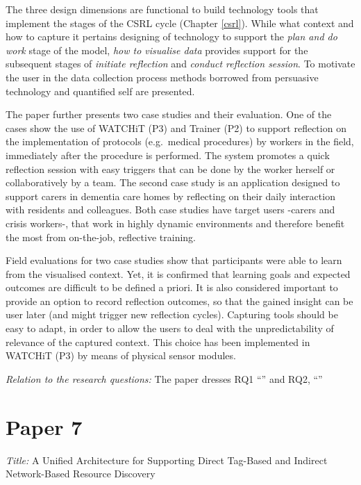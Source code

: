 The three design dimensions are functional to build technology tools that implement the stages of the CSRL cycle (Chapter \ref{csrl}). While what context and how to capture it pertains designing of technology to support the \emph{plan and do work} stage of the model, \emph{how to visualise data} provides support for the subsequent stages of \emph{initiate reflection} and \emph{conduct reflection session}. To motivate the user in the data collection process methods borrowed from persuasive technology and quantified self are presented.

The paper further presents two case studies and their evaluation. One of the cases show the use of WATCHiT (P3) and Trainer (P2) to support reflection on the implementation of protocols (e.g.~medical procedures) by workers in the field, immediately after the procedure is performed. The system promotes a quick reflection session with easy triggers that can be done by the worker herself or collaboratively by a team. The second case study is an application designed to support carers in dementia care homes by reflecting on their daily interaction with residents and colleagues. Both case studies have target users -carers and crisis workers-, that work in highly dynamic environments and therefore benefit the most from on-the-job, reflective training.

Field evaluations for two case studies show that participants were able to learn from the visualised context. Yet, it is confirmed that learning goals and expected outcomes are difficult to be defined a priori. It is also considered important to provide an option to record reflection outcomes, so that the gained insight can be user later (and might trigger new reflection cycles). Capturing tools should be easy to adapt, in order to allow the users to deal with the unpredictability of relevance of the captured context. This choice has been implemented in WATCHiT (P3) by means of physical sensor modules.

\emph{Relation to the research questions: } The paper dresses RQ1 ``\RQi'' and RQ2, ``\RQii''

\section[A Unified Architecture for Supporting Direct Tag-Based and Indirect Network-Based Resource Discovery]{Paper 7}\label{paper-7}

\emph{Title:} A Unified Architecture for Supporting Direct Tag-Based and Indirect Network-Based Resource Discovery

